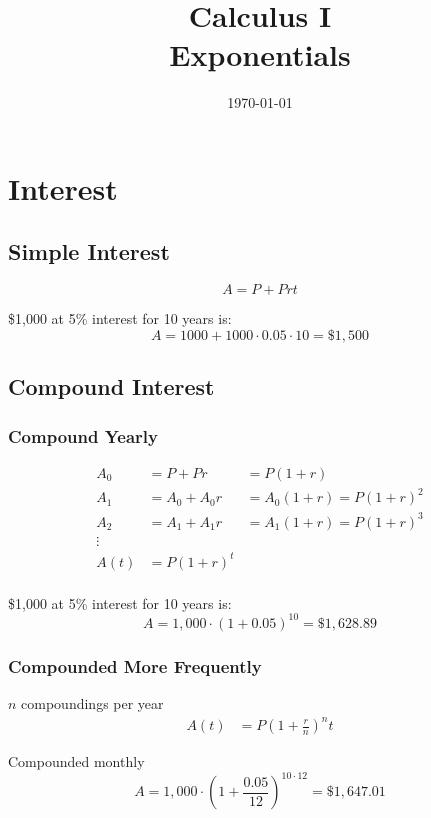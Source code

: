 \documentclass[letterpaper, landscape]{exam}
\author{}
\date{\today}
\title{Calculus I \\ Exponentials}
\begin{document}
  \maketitle
  \tableofcontents

  \section{Interest}

  \subsection{Simple Interest} %
  \[
    A = P + Prt
  \]

  \$1,000 at 5\% interest for 10 years is:
  \[
    A = 1000 + 1000 \cdot 0.05 \cdot 10 = \$1,500
  \]

  \subsection{Compound Interest} %

  \subsubsection{Compound Yearly} %
  \begin{align*}
    A_0 &= P + Pr &= P(1 + r) \\
    A_1 &= A_0 + A_0 r &= A_0 (1 + r) = P(1 + r)^2 \\
    A_2 &= A_1 + A_1 r &= A_1 (1 + r) = P(1 + r)^3 \\
    \vdots \\
    A(t) &= P(1 + r)^t \\
  \end{align*}
  
  \$1,000 at 5\% interest for 10 years is:
  \[
    A = 1,000 \cdot (1 + 0.05)^{10} = \$1,628.89
  \]

  \subsubsection{Compounded More Frequently} %

  $n$ compoundings per year
  \begin{align*}
    A(t) &= P \left(1 + \frac{r}{n} \right)^nt
  \end{align*}
  
  Compounded monthly
  \[
    A = 1,000 \cdot \left( 1 + \frac{0.05}{12} \right)^{10 \cdot 12} = \$1,647.01
  \]
\end{document}

